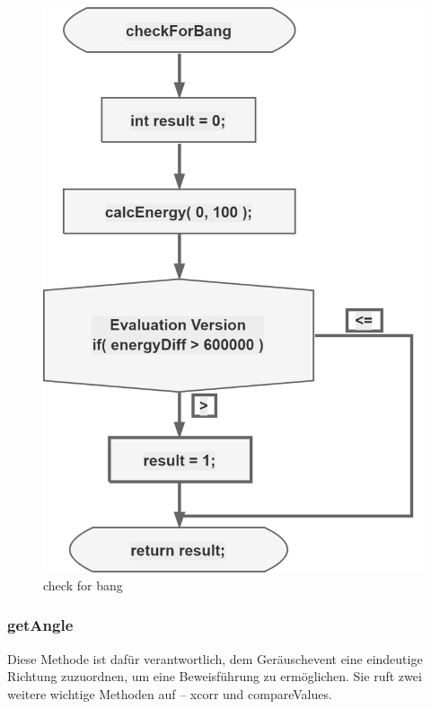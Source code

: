 \begin{figure}[!h]
	\begin{center}
		\includegraphics[scale=0.5]{Sections/Programmierung/checkForBang}
	\end{center}
	\caption{check for bang}
	\label{fig:checkForBang}
\end{figure}

\subsubsection{getAngle}

Diese Methode ist dafür verantwortlich, dem Geräuschevent eine eindeutige Richtung zuzuordnen, um eine Beweisführung zu ermöglichen. Sie ruft zwei weitere wichtige Methoden auf – xcorr und compareValues.


